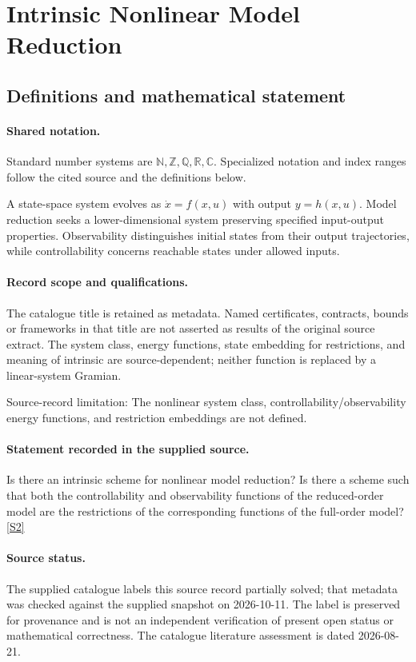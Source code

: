 \documentclass[11pt]{article}
\newcommand{\sref}[2]{\hyperlink{source:#1:#2}{[S#2]}}
\begin{document}
\section{Intrinsic Nonlinear Model Reduction}\label{statement}

\subsection{Definitions and mathematical statement}

\paragraph{Shared notation.}Standard number systems are $\mathbb N,\mathbb Z,\mathbb Q,\mathbb R,\mathbb C$. Specialized notation and index ranges follow the cited source and the definitions below.


A state-space system evolves as $\dot x=f(x,u)$ with output $y=h(x,u)$. Model reduction seeks a lower-dimensional system preserving specified input-output properties. Observability distinguishes initial states from their output trajectories, while controllability concerns reachable states under allowed inputs.
\paragraph{Record scope and qualifications.}
The catalogue title is retained as metadata. Named certificates, contracts, bounds or frameworks in that title are not asserted as results of the original source extract.
The system class, energy functions, state embedding for restrictions, and meaning of intrinsic are source-dependent; neither function is replaced by a linear-system Gramian.

Source-record limitation: The nonlinear system class, controllability/observability energy functions, and restriction embeddings are not defined.
\paragraph{Statement recorded in the supplied source.}
Is there an intrinsic scheme for nonlinear model reduction? Is there a scheme such that both the controllability and observability functions of the reduced-order model are the restrictions of the corresponding functions of the full-order model? \sref{statement}{2}
\paragraph{Source status.}
The supplied catalogue labels this source record partially solved; that metadata was checked against the supplied snapshot on 2026-10-11. The label is preserved for provenance and is not an independent verification of present open status or mathematical correctness. The catalogue literature assessment is dated 2026-08-21.
\end{document}
